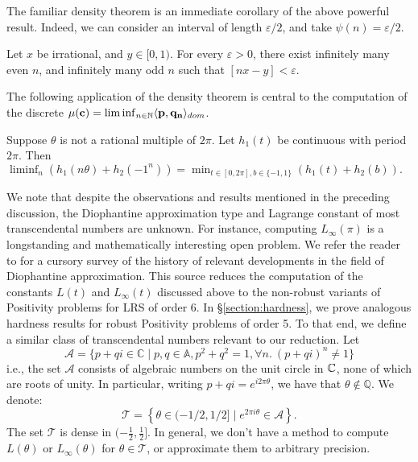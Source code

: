 The familiar density theorem is an immediate corollary of the above powerful result. Indeed, we can consider an interval of length $\varepsilon/2$, and take $\psi(n) = \varepsilon/2$.
\begin{lemma}
\label{lemma:density}
Let $x$ be irrational, and $y \in [0, 1)$. For every $\varepsilon > 0$, there exist infinitely many even $n$, and infinitely many odd $n$ such that $[nx - y] < \varepsilon$.
\end{lemma}

The following application of the density theorem is central to the computation of the discrete $\mu(\mathbf{c}) = \liminf_{n\in \mathbb{N}}\langle\mathbf{p}, \mathbf{q_n}\rangle_{dom}$.
\begin{lemma}
\label{eq:liminfmin}
Suppose $\theta$ is not a rational multiple of $2\pi$. Let $h_1(t)$ be continuous with period $2\pi$. Then
$
\liminf_n \left(h_1(n\theta) + h_2(-1^n)\right) = \min_{t \in [0, 2\pi], b\in \{-1, 1\}} \left(h_1(t) + h_2(b)\right).
$
\end{lemma}

We note that despite the observations and results mentioned in the preceding discussion, the Diophantine approximation type and Lagrange constant of most transcendental numbers are unknown. For instance, computing $L_\infty(\pi)$ is a longstanding and mathematically interesting open problem. We refer the reader to \cite[Section 5]{joeljames3} for a cursory survey of the history of relevant developments in the field of Diophantine approximation. This source reduces the computation of the constants $L(t)$ and $L_\infty(t)$ discussed above to the non-robust variants of Positivity problems for LRS of order 6. In \S\ref{section:hardness}, we prove analogous hardness results for robust Positivity problems of order 5. To that end, we define a similar class of transcendental numbers relevant to our reduction. Let
\begin{equation}
\mathcal A=\{p+q i \in \mathbb{C} \mid p,q \in \mathbb{A}, p^2+q^2=1, \forall n.~(p + qi)^n \ne 1\}
\end{equation}
i.e., the set $\mathcal A$ consists of algebraic numbers on the unit circle in $\mathbb{C}$, none of which are roots of unity. In particular, writing $p+q i= e^{i 2 \pi \theta}$, we have that $\theta \notin \mathbb{Q}$. We denote:
\begin{equation}
\label{eq:keyset}
\mathcal{T} = \left\{ \theta \in (- 1/2, 1/2] \mid e^{2 \pi i \theta} \in \mathcal{A}\right\}.
\end{equation}
The set $\mathcal{T}$ is dense in $(- \frac 1 2, \frac 1 2]$. In general, we don't have a method to compute $L(\theta)$ or $L_\infty(\theta)$ for $\theta \in \mathcal{T}$, or approximate them to arbitrary precision.

